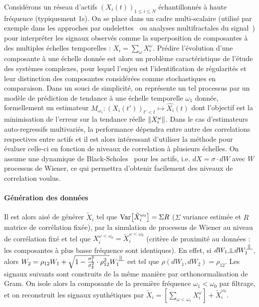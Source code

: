 Considérons un réseau d'actifs $(X_i(t))_{1\leq i \leq N}$ échantillonnés à haute fréquence (typiquement 1s). On se place dans un cadre multi-scalaire (utilisé par exemple dans les approches par ondelettes~\cite{ramsey2002wavelets} ou analyses multifractales du signal~\cite{bouchaud2000apparent}) pour interpréter les signaux observés comme la superposition de composantes à des multiples échelles temporelles : $X_i=\sum_{\omega}{X_i^{\omega}}$. Prédire l'évolution d'une composante à une échelle donnée est alors un problème caractéristique de l'étude des systèmes complexes, pour lequel l'enjeu est l'identification de régularités et leur distinction des composantes considérées comme stochastiques en comparaison. Dans un souci de simplicité, on représente un tel processus par un modèle de prédiction de tendance à une échelle temporelle $\omega_1$ donnée, formellement un estimateur $M_{\omega_1} : (X_i(t'))_{t'<t} \mapsto \hat{X_i}(t)$ dont l'objectif est la minimisation de l'erreur sur la tendance réelle $\| X_i^{\omega} \|$. Dans le cas d'estimateurs auto-regressifs multivariés, la performance dépendra entre autre des correlations respectives entre actifs et il est alors intéressant d'utiliser la méthode pour évaluer celle-ci en fonction de niveaux de correlation à plusieurs échelles. On assume une dynamique de Black-Scholes~\cite{jarrow1999honor} pour les actifs, i.e. $dX = \sigma\cdot dW$ avec $W$ processus de Wiener, ce qui permettra d'obtenir facilement des niveaux de correlation voulus.

\paragraph{Génération des données}

Il est alors aisé de générer $\tilde{X}_i$ tel que $\operatorname{Var}\!\left[\tilde{X}_i^{\omega_0}\right]=\Sigma R$ ($\Sigma$ variance estimée et $R$ matrice de corrélation fixée), par la simulation de processus de Wiener au niveau de corrélation fixé et tel que $X_i^{\omega < \omega_0} = \tilde{X}_i^{\omega < \omega_0}$ (critère de proximité au données : les composantes à plus basse fréquence sont identiques). En effet, si $dW_1 \indep dW_1^{\indep}$, alors $W_2 = \rho_{12}W_1 + \sqrt{1-\frac{\sigma_1^2}{\sigma_2^2}\cdot\rho_{12}^2}W_1^{\indep}$ est tel que $\rho(dW_1,dW_2)=\rho_{12}$. Les signaux suivants sont construits de la même manière par orthonormalisation de Gram. On isole alors la composante de la première fréquence $\omega_1 < \omega_0$ par filtrage, et on reconstruit les signaux synthétiques par $\tilde{X}_i = [\sum_{\omega<\omega_1}X_i^{\omega}]+\tilde{X}_i^{\omega_0}$.


